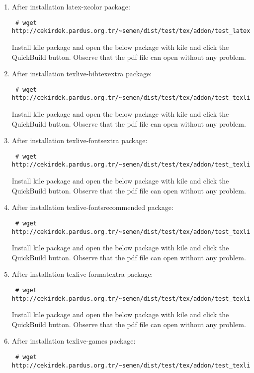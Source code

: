 \documentclass[a4paper,10pt]{article}
\begin{document}
\begin{enumerate}
\item After installation latex-xcolor package:
\begin{verbatim}
 # wget http://cekirdek.pardus.org.tr/~semen/dist/test/tex/addon/test_latexxcolor.tex
\end{verbatim}

Install kile package and open the below package with kile and click the QuickBuild button. Observe that the pdf file can open without any problem.

\item After installation texlive-bibtexextra package:
\begin{verbatim}
 # wget http://cekirdek.pardus.org.tr/~semen/dist/test/tex/addon/test_texlivebibtexextra.tex
\end{verbatim}

Install kile package and open the below package with kile and click the QuickBuild button. Observe that the pdf file can open without any problem.
\item After installation texlive-fontsextra package:
\begin{verbatim}
 # wget http://cekirdek.pardus.org.tr/~semen/dist/test/tex/addon/test_texlivefontsextra.tex
\end{verbatim}

Install kile package and open the below package with kile and click the QuickBuild button. Observe that the pdf file can open without any problem.

\item After installation texlive-fontsrecommended package:
\begin{verbatim}
 # wget http://cekirdek.pardus.org.tr/~semen/dist/test/tex/addon/test_texlivefontsrecommended.tex
\end{verbatim}

Install kile package and open the below package with kile and click the QuickBuild button. Observe that the pdf file can open without any problem.

\item After installation texlive-formatextra package:
\begin{verbatim}
 # wget http://cekirdek.pardus.org.tr/~semen/dist/test/tex/addon/test_texliveformatsextra.tex
\end{verbatim}

Install kile package and open the below package with kile and click the QuickBuild button. Observe that the pdf file can open without any problem.

\item After installation texlive-games package:
\begin{verbatim}
 # wget http://cekirdek.pardus.org.tr/~semen/dist/test/tex/addon/test_texlivegames.tex
\end{verbatim}


\end{enumerate}
\end{document}
